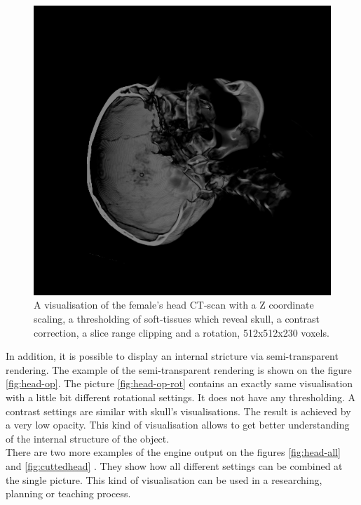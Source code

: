 \documentclass[twoside, english, 11pt]{report}
\begin{document}
\begin{figure}[H]
\centerline{\includegraphics[scale = 0.7]{img/head-clip-rot}}
\caption{A visualisation of the female's head CT-scan with a Z coordinate scaling, a thresholding of soft-tissues which reveal skull, a contrast correction, a slice range clipping and a rotation, 512x512x230 voxels.\label{fig:head-clip-rot}}
\end{figure}

In addition, it is possible to display an internal stricture via semi-transparent rendering. The example of the semi-transparent rendering is shown on the figure \ref{fig:head-op}. The picture \ref{fig:head-op-rot} contains an exactly same visualisation with a little bit different rotational settings. It does not have any thresholding. A contrast settings are similar with skull's visualisations. The result is achieved by a very low opacity. This kind of visualisation allows to get better understanding of the internal structure of the object.\\

There are two more examples of the engine output on the figures \ref{fig:head-all} and \ref{fig:cuttedhead} . They show how all different settings can be combined at the single picture. This kind of visualisation can be used in a researching, planning or teaching process.
\end{document}
